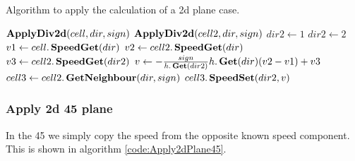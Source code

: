\begin{algorithm}
\caption{Algorithm to apply the calculation of a 2d plane case.}\label{code:Apply2dPlane}
\begin{algorithmic}[1]
	\State $\mathop{\textbf{ApplyDiv2d}}(cell,dir,sign)$
	\State $\mathop{\textbf{ApplyDiv2d}}(cell2,dir,sign)$
	\State $dir2 \gets 1$
	\State $dir2\gets 2$ 
	\EndIf    
	\State $v1 \gets cell.\mathop{\textbf{SpeedGet}}(dir)$
	\State $v2 \gets cell2.\mathop{\textbf{SpeedGet}}(dir)$
	\State $v3 \gets cell2.\mathop{\textbf{SpeedGet}}(dir2)$
	\State $v \gets -\frac{sign}{h.\mathop{\textbf{Get}}(dir2)}h.\mathop{\textbf{Get}}(dir)(v2-v1)+v3$ 
	\State $cell3 \gets cell2.\mathop{\textbf{GetNeighbour}}(dir,sign)$
	\State $cell3.\mathop{\textbf{SpeedSet}}(dir2,v)$ 
\EndFunction
	\end{algorithmic}
\end{algorithm}

\subsubsection{Apply 2d \unit{45}{\degree} plane}

In the \unit{45}{\degree} we simply copy the speed from the opposite known speed component.
This is shown in algorithm \ref{code:Apply2dPlane45}.

